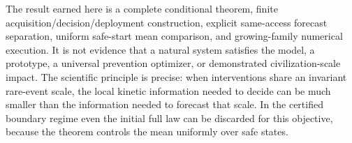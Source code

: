 The result earned here is a complete conditional theorem, finite acquisition/decision/deployment construction, explicit same-access forecast separation, uniform safe-start mean comparison, and growing-family numerical execution. It is not evidence that a natural system satisfies the model, a prototype, a universal prevention optimizer, or demonstrated civilization-scale impact. The scientific principle is precise: when interventions share an invariant rare-event scale, the local kinetic information needed to decide can be much smaller than the information needed to forecast that scale. In the certified boundary regime even the initial full law can be discarded for this objective, because the theorem controls the mean uniformly over safe states.
